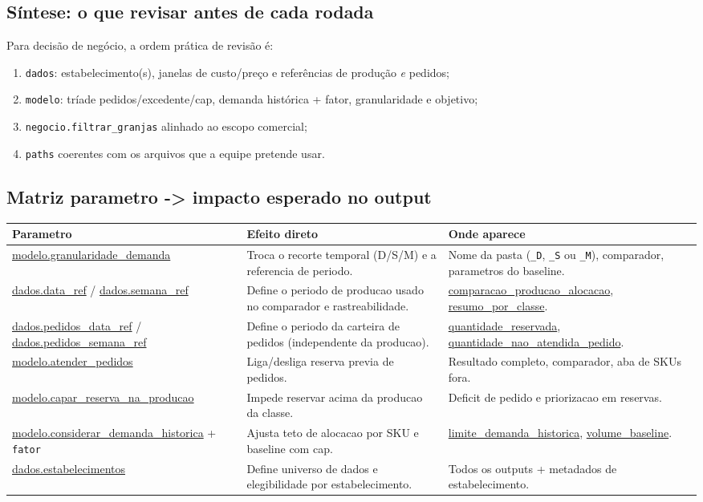 \documentclass[11pt,a4paper]{article}
\begin{document}
\subsection{Síntese: o que revisar antes de cada rodada}

Para decisão de negócio, a ordem prática de revisão é:
\begin{enumerate}[leftmargin=1.2cm]
    \item \texttt{dados}: estabelecimento(s), janelas de custo/preço e referências
    de produção \emph{e} pedidos;
    \item \texttt{modelo}: tríade pedidos/excedente/cap, demanda histórica + fator,
    granularidade e objetivo;
    \item \texttt{negocio.filtrar\_granjas} alinhado ao escopo comercial;
    \item \texttt{paths} coerentes com os arquivos que a equipe pretende usar.
\end{enumerate}

\subsection{Matriz parametro -> impacto esperado no output}

\begin{longtable}{>{\raggedright\arraybackslash}p{5.2cm}>{\raggedright\arraybackslash}p{5.0cm}>{\raggedright\arraybackslash}p{5.0cm}}
\toprule
\textbf{Parametro} & \textbf{Efeito direto} & \textbf{Onde aparece} \\
\midrule
\endhead
\url{modelo.granularidade_demanda} & Troca o recorte temporal (D/S/M) e a referencia de periodo. & Nome da pasta (\texttt{\_D}, \texttt{\_S} ou \texttt{\_M}), comparador, parametros do baseline. \\
\url{dados.data_ref} / \url{dados.semana_ref} & Define o periodo de producao usado no comparador e rastreabilidade. & \url{comparacao_producao_alocacao}, \url{resumo_por_classe}. \\
\url{dados.pedidos_data_ref} / \url{dados.pedidos_semana_ref} & Define o periodo da carteira de pedidos (independente da producao). & \url{quantidade_reservada}, \url{quantidade_nao_atendida_pedido}. \\
\url{modelo.atender_pedidos} & Liga/desliga reserva previa de pedidos. & Resultado completo, comparador, aba de SKUs fora. \\
\url{modelo.capar_reserva_na_producao} & Impede reservar acima da producao da classe. & Deficit de pedido e priorizacao em reservas. \\
\url{modelo.considerar_demanda_historica} + \texttt{fator} & Ajusta teto de alocacao por SKU e baseline com cap. & \url{limite_demanda_historica}, \url{volume_baseline}. \\
\url{dados.estabelecimentos} & Define universo de dados e elegibilidade por estabelecimento. & Todos os outputs + metadados de estabelecimento. \\
\bottomrule
\end{longtable}
\end{document}
